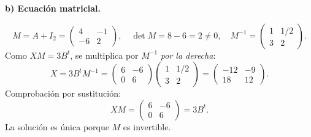 \textbf{b) Ecuación matricial.}\par\nopagebreak[4]
\[
M=A+I_2=\begin{pmatrix}4&-1\\-6&2\end{pmatrix},\quad
\det M=8-6=2\ne0,\quad
M^{-1}=\begin{pmatrix}1&1/2\\3&2\end{pmatrix}.
\]
Como $XM=3B^t$, se multiplica por $M^{-1}$ \emph{por la derecha}:
\[
X=3B^tM^{-1}=\begin{pmatrix}6&-6\\0&6\end{pmatrix}
\begin{pmatrix}1&1/2\\3&2\end{pmatrix}
=\boxed{\begin{pmatrix}-12&-9\\18&12\end{pmatrix}.}
\]
Comprobación por sustitución:
\[
XM=\begin{pmatrix}6&-6\\0&6\end{pmatrix}=3B^t.
\]
La solución es única porque $M$ es invertible.
